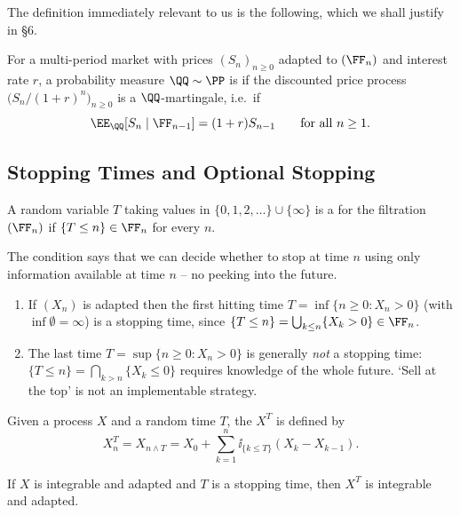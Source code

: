 The definition immediately relevant to us is the following, which we shall justify in \S6.

\begin{definition}
	For a multi-period market with prices $(S_n)_{n\geq0}$ adapted to $(\FF_n)$ and interest rate $r$, a probability measure $\QQ\sim\PP$ is  if the discounted price process $\big(S_n/(1+r)^n\big)_{n \geq 0}$ is a $\QQ$-martingale, i.e.\ if
	$$
	\EE_\QQ[S_n \mid \FF_{n-1}] = (1+r)S_{n-1}\qquad \text{for all } n\geq1.
	$$
\end{definition}

\subsection{Stopping Times and Optional Stopping}

\begin{definition}
	A random variable $T$ taking values in $\{0,1,2,\dots\}\cup\{\infty\}$ is a  for the filtration $(\FF_n)$ if $\{T \leq n\}\in\FF_n$ for every $n$.
\end{definition}

The condition says that we can decide whether to stop at time $n$ using only information available at time $n$ -- no peeking into the future.

\begin{example}
	\begin{enumerate}[label=(\roman*)]
		\item If $(X_n)$ is adapted then the first hitting time $T = \inf\{n\geq 0 : X_n > 0\}$ (with $\inf\emptyset = \infty$) is a stopping time, since $\{T \leq n\} = \bigcup_{k\leq n}\{X_k > 0\}\in\FF_n$.
		\item The last time $T = \sup\{n \geq 0 : X_n > 0\}$ is generally \emph{not} a stopping time: $\{T\leq n\} = \bigcap_{k>n}\{X_k \leq 0\}$ requires knowledge of the whole future. `Sell at the top' is not an implementable strategy.
	\end{enumerate}
\end{example}

\begin{definition}
	Given a process $X$ and a random time $T$, the  $X^T$ is defined by
	$$
	X_n^T = X_{n\wedge T} = X_0 + \sum_{k=1}^n \ii_{\{k\leq T\}}(X_k - X_{k-1}).
	$$
\end{definition}

\begin{proposition}
	If $X$ is integrable and adapted and $T$ is a stopping time, then $X^T$ is integrable and adapted.
\end{proposition}

